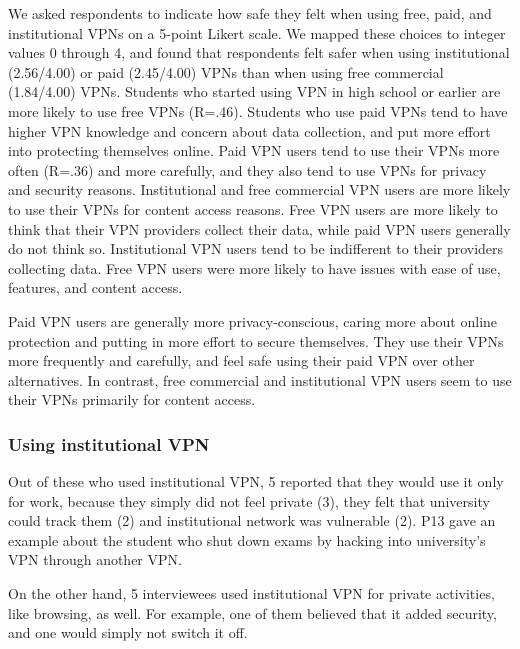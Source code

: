 We asked respondents to indicate how safe they felt when using free, paid, and
institutional VPNs on a 5-point Likert scale. We mapped these choices to
integer values 0 through 4, and found that respondents felt safer when using
institutional (2.56/4.00) or paid (2.45/4.00) VPNs than when using free
commercial (1.84/4.00) VPNs. Students who started using VPN in high school or
earlier are more likely to use free VPNs (R=.46). Students who use paid VPNs
tend to have higher VPN knowledge and concern about data collection, and put
more effort into protecting themselves online. Paid VPN users tend to use
their VPNs more often (R=.36) and more carefully, and they also tend to use
VPNs for privacy and security reasons. Institutional and free commercial VPN
users are more likely to use their VPNs for content access reasons. Free VPN
users are more likely to think that their VPN providers collect their data,
while paid VPN users generally do not think so. Institutional VPN users tend
to be indifferent to their providers collecting data. Free VPN users were more
likely to have issues with ease of use, features, and content access.

Paid VPN users are generally more privacy-conscious, caring more about online
protection and putting in more effort to secure themselves. They use their
VPNs more frequently and carefully, and feel safe using their paid VPN over
other alternatives. In contrast, free commercial and institutional VPN users
seem to use their VPNs primarily for content access.


\subsubsection{Using institutional VPN} Out of these who used institutional
VPN, 5 reported that they would use it only for work, because they simply did
not feel private (3), they felt that university could track them (2) and
institutional network was vulnerable  (2). P13 gave an example about the
student who shut down exams by hacking into university's VPN through another
VPN. %

On the other hand, 5 interviewees used institutional VPN for private
activities, like browsing, as well. For example, one of them believed that it
added security, and one would simply not switch it off. 

